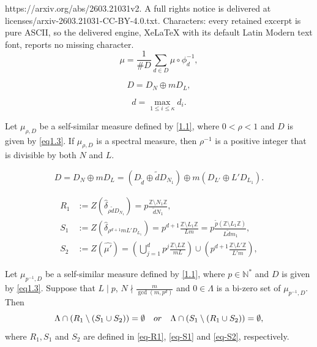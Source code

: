 \documentclass[10pt,a4paper]{amsart}
\begin{document}
https://arxiv.org/abs/2603.21031v2. A full rights notice is delivered at licenses/arxiv-2603.21031-CC-BY-4.0.txt. Characters: every retained excerpt is pure ASCII, so the delivered engine, XeLaTeX with its default Latin Modern text font, reports no missing character.
	\begin{equation}\label{1.1}
		\mu=\frac{1}{\# D}\sum_{d\in D}\mu\circ\phi_d^{-1},
	\end{equation}

\begin{equation}\label{eq1.3}
	D = D_N \oplus mD_L,
\end{equation}

\begin{equation}\label{eq3.1.0}
	d = \max_{1 \le i \le \kappa} d_i .
\end{equation}

\begin{proposition}\label{pro1.1}
Let $\mu_{\rho,D}$ be a self-similar measure defined by \eqref{1.1}, where
$0<\rho<1$ and $D$ is given by \eqref{eq1.3}.
If $\mu_{\rho,D}$ is a spectral measure, then $\rho^{-1}$ is a positive integer that is divisible by both $N$ and $L$.
\end{proposition}

\begin{equation}\label{D-S-Decompose}
D= D_N \oplus m D_L = \left(D_{\tilde{d}} \oplus \tilde{d} D_{N_1} \right) \oplus m \left( D_{L'} \oplus L' D_{L_1} \right).
\end{equation}

\begin{align}
	R_1 &:= Z(\hat{\delta}_{\rho \tilde{d}D_{N_1}})
	= p \frac{\mathbb{Z} \setminus N_1 \mathbb{Z}}{\tilde{d} N_1},
	\label{eq-R1} \\[0.5em]
	S_1 &:= Z(\hat{\delta}_{\rho^{d+1} mL'D_{L_1}})
=p^{d+1} \frac{\mathbb{Z} \setminus L_1 \mathbb{Z}}{L m}
=p \frac{\tilde{p} (\mathbb{Z} \setminus L_1 \mathbb{Z})}
	{L \tilde{d} m_1},
	\label{eq-S1} \\[0.5em]
	S_2 &:= Z(\widehat{\mu'})
	= \left( \bigcup_{j=1}^{d} p^j
	\frac{\mathbb{Z} \setminus L \mathbb{Z}}{m L} \right)
	\cup \left( p^{d+1}
	\frac{\mathbb{Z} \setminus L' \mathbb{Z}}{L' m} \right),
	\label{eq-S2}
\end{align}

\begin{proposition}\label{empty-set}
Let $\mu_{p^{-1},D}$ be a self-similar measure defined by \eqref{1.1}, where $p\in\mathbb{N}^*$ and $D$ is given by \eqref{eq1.3}.  Suppose that $L\mid p$, $N \nmid \frac{m}{\gcd(m, p^d)}$ and $0 \in \Lambda$ is a bi-zero set of $\mu_{p^{-1},D}$. Then
\begin{equation*}
\Lambda\cap (R_1 \setminus (S_1\cup S_2))=\emptyset \quad {\rm{or}} \quad\Lambda\cap (S_1 \setminus (R_1\cup S_2))=\emptyset,
\end{equation*}
where $R_1, S_1$ and $S_2$ are defined in \eqref{eq-R1}, \eqref{eq-S1} and \eqref{eq-S2}, respectively.
\end{proposition}
\end{document}
